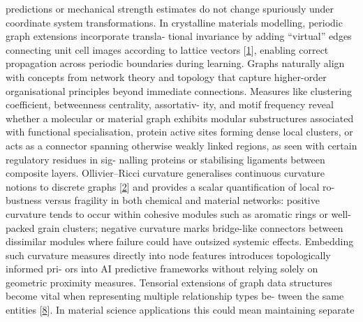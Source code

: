 \documentclass[
]{article}
\begin{document}
predictions or mechanical strength estimates do not change spuriously
under coordinate system transformations. In crystalline materials
modelling, periodic graph extensions incorporate transla- tional
invariance by adding ``virtual'' edges connecting unit cell images
according to lattice vectors {[}\hyperref[_bookmark41]{1}{]}, enabling
correct propagation across periodic boundaries during learning. Graphs
naturally align with concepts from network theory and topology that
capture higher-order organisational principles beyond immediate
connections. Measures like clustering coefficient, betweenness
centrality, assortativ- ity, and motif frequency reveal whether a
molecular or material graph exhibits modular substructures associated
with functional specialisation, protein active sites forming dense local
clusters, or acts as a connector spanning otherwise weakly linked
regions, as seen with certain regulatory residues in sig- nalling
proteins or stabilising ligaments between composite layers.
Ollivier--Ricci curvature generalises continuous curvature notions to
discrete graphs {[}\hyperref[_bookmark42]{2}{]} and provides a scalar
quantification of local ro- bustness versus fragility in both chemical
and material networks: positive curvature tends to occur within cohesive
modules such as aromatic rings or well-packed grain clusters; negative
curvature marks bridge-like connectors between dissimilar modules where
failure could have outsized systemic effects. Embedding such curvature
measures directly into node features introduces topologically informed
pri- ors into AI predictive frameworks without relying solely on
geometric proximity measures. Tensorial extensions of graph data
structures become vital when representing multiple relationship types
be- tween the same entities {[}\hyperref[_bookmark48]{8}{]}. In material
science applications this could mean maintaining separate
\end{document}
